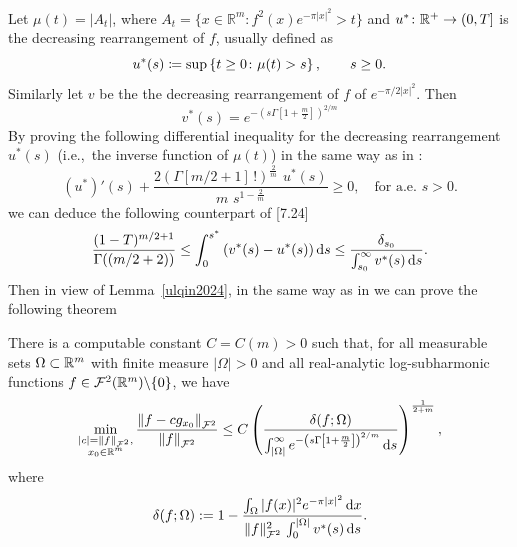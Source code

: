 \documentclass[a4paper,10pt]{amsart}
\newcommand\ee{v^*}
\newcommand{\Fock}{\mcalF^2}
\newcommand{\Fnorm}[1]{\norm{#1}_{\Fock}}
\newcommand{\Om}{\Omega}
\begin{document}
Let $\mu(t)=|A_t|$, where $A_t=\{x\in\mathbb{R}^m: f^2(x)e^{-\pi |x|^2}>t\}$ and
$u^*\colon \mathbb{R}^+\to (0,T]$ is the decreasing rearrangement of $f$, usually
defined as
\begin{equation}\label{eqn:defu*}
    u^*(s) \coloneqq \sup \left \{ t \geq 0 \colon \mu(t) > s \right \},\qquad
    s\geq 0.
\end{equation}
Similarly let $v$ be the the decreasing rearrangement of $f$ of $e^{-\pi/2 |x|^2}.$ Then $$v^\ast(s)=e^{-\left(s \Gamma\left[1+\frac{m}{2}\right]\right)^{2/m}}$$
By proving the following differential inequality for the decreasing rearrangement $u^*(s)$ (i.e.,\ the inverse function of $\mu(t)$) in the same way as in \cite{GomezGuerraRamosTilli2024}:
\begin{equation}
    \label{diffinequd}
    (u^*)'(s)+\frac {2(\Gamma[m/2+1]\,!)^{\frac {2}{m}}\,\, u^*(s)}{m \,\, s^{1-\frac {2}{m}}}\geq 0,\quad \text{for a.e. $s>0$.}
\end{equation}
we can deduce the following counterpart of \cite{GomezGuerraRamosTilli2024}[7.24]
\begin{equation}
    \label{estlemma1d}
\frac {(1-T)^{m/2+1}}{\Gamma((m/2+2))}\leq \int_0^{s^*}\left(\ee(s)-u^*(s)\right)\diff s\leq
\frac {\delta_{s_0}}{\int_{s_0}^\infty \ee(s)\diff s}.
\end{equation} Then in view of Lemma~\ref{ulqin2024}, in the same way as in \cite{GomezGuerraRamosTilli2024} we can prove the following theorem
\begin{numthm}\label{thm:StabilityFockSpaceDimensiond}
   There is a computable constant $C=C(m)>0$ such that, for all  measurable sets $\Om \subset \R^{m}$ with finite measure $|\Omega|>0$ and all real-analytic log-subharmonic functions $f\in \Fock(\R^m)\backslash\{0\}$, we have
    \begin{equation}\label{eqn:StabilityFunctionFockDimensiond}
        \min_{\substack{|c|=\|f\|_{\Fock},\\ x_0\in \R^m}} \frac{\Fnorm{f-cg_{x_0}}}{\Fnorm{f}} \leq
        C
        \left(\frac{\delta(f;\Om)}
      {\int_{|\Omega|}^\infty   e^{-\left(s \Gamma\left[1+\frac{m}{2}\right]\right)^{2/m}}\diff s  } \right)^{\frac 1 {2+m}},
    \end{equation}
where
\begin{equation}
\label{defdeltaFOd}
\delta(f;\Omega):=1-\frac{\int_\Omega |f(x)|^2 e^{-\pi |x|^2}\diff x}
{\Vert f\Vert_{\Fock}^2\, \int_0^{|\Omega|} \ee(s)\diff s}.
\end{equation}
\end{numthm}
\end{document}
